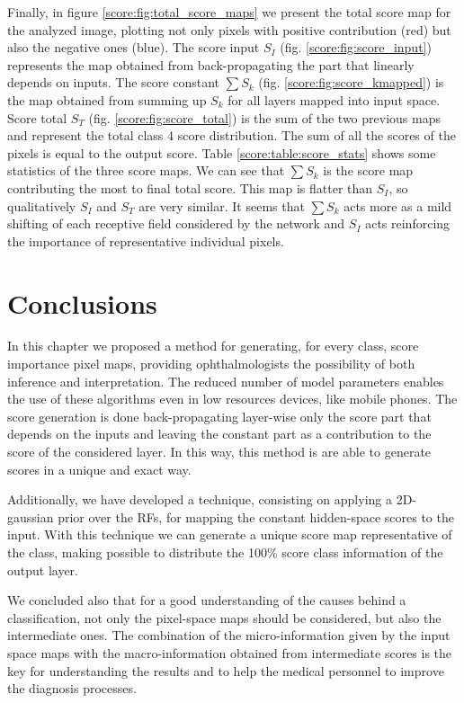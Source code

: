Finally, in figure \ref{score:fig:total_score_maps} we present the total score map for the analyzed image, plotting not only pixels with positive contribution (red) but also the negative ones (blue). The score input $S_I$ (fig. \ref{score:fig:score_input}) represents the map obtained from back-propagating the part that linearly depends on inputs. The score constant $\sum S_k$ (fig. \ref{score:fig:score_kmapped}) is the map obtained from summing up $S_k$ for all layers mapped into input space. Score total $S_T$ (fig. \ref{score:fig:score_total}) is the sum of the two previous maps and represent the total class 4 score distribution. The sum of all the scores of the pixels is equal to the output score. Table \ref{score:table:score_stats} shows some statistics of the three score maps. We can see that $\sum S_k$ is the score map contributing the most to final total score. This map is flatter than $S_I$, so qualitatively $S_I$ and $S_T$ are very similar. It seems that $\sum S_k$ acts more as a mild shifting of each receptive field considered by the network and $S_I$ acts reinforcing the importance of representative individual pixels.

\section{Conclusions}\label{score:sec:conclusions}

In this chapter we proposed a method for generating, for every class, score importance pixel maps, providing ophthalmologists the possibility of both inference and interpretation. The reduced number of model parameters enables the use of these algorithms even in low resources devices, like mobile phones. The score generation is done back-propagating layer-wise only the score part that depends on the inputs and leaving the constant part as a contribution to the score of the considered layer. In this way, this method is are able to generate scores in a unique and exact way. 

Additionally, we have developed a technique, consisting on applying a 2D-gaussian prior over the RFs, for mapping the constant hidden-space scores to the input. With this technique we can generate a unique score map representative of the class, making possible to distribute the 100\% score class information of the output layer. 

We concluded also that for a good understanding of the causes behind a classification, not only the pixel-space maps should be considered, but also the intermediate ones. The combination of the micro-information given by the input space maps with the macro-information obtained from intermediate scores is the key for understanding the results and to help the medical personnel to improve the diagnosis processes.

